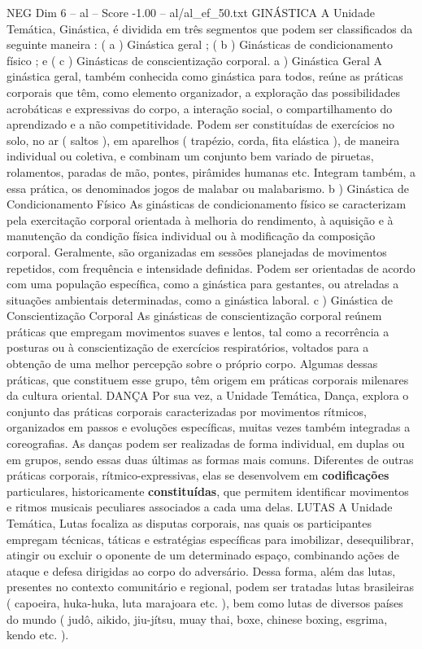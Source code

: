 \begin{textsample}{NEG Dim 6 – al – Score -1.00 – al/al\_ef\_50.txt}  \label{ex:f6_neg_061}
GINÁSTICA A Unidade Temática, Ginástica, é dividida em três segmentos que podem ser classificados da seguinte maneira : ( a ) Ginástica geral ; ( b ) Ginásticas de condicionamento físico ; e ( c ) Ginásticas de conscientização corporal. a ) Ginástica Geral A ginástica geral, também conhecida como ginástica para todos, reúne as práticas corporais que têm, como elemento organizador, a exploração das possibilidades acrobáticas e expressivas do corpo, a interação social, o compartilhamento do aprendizado e a não competitividade.
Podem ser constituídas de exercícios no solo, no ar ( saltos ), em aparelhos ( trapézio, corda, fita elástica ), de maneira individual ou coletiva, e combinam um conjunto bem variado de piruetas, rolamentos, paradas de mão, pontes, pirâmides humanas etc.
Integram também, a essa prática, os denominados jogos de malabar ou malabarismo. b ) Ginástica de Condicionamento Físico As ginásticas de condicionamento físico se caracterizam pela exercitação corporal orientada à melhoria do rendimento, à aquisição e à manutenção da condição física individual ou à modificação da composição corporal.
Geralmente, são organizadas em sessões planejadas de movimentos repetidos, com frequência e intensidade definidas.
Podem ser orientadas de acordo com uma população específica, como a ginástica para gestantes, ou atreladas a situações ambientais determinadas, como a ginástica laboral. c ) Ginástica de Conscientização Corporal As ginásticas de conscientização corporal reúnem práticas que empregam movimentos suaves e lentos, tal como a recorrência a posturas ou à conscientização de exercícios respiratórios, voltados para a obtenção de uma melhor percepção sobre o próprio corpo.
Algumas dessas práticas, que constituem esse grupo, têm origem em práticas corporais milenares da cultura oriental.
DANÇA Por sua vez, a Unidade Temática, Dança, explora o conjunto das práticas corporais caracterizadas por movimentos rítmicos, organizados em passos e evoluções específicas, muitas vezes também integradas a coreografias.
As danças podem ser realizadas de forma individual, em duplas ou em grupos, sendo essas duas últimas as formas mais comuns.
Diferentes de outras práticas corporais, rítmico-expressivas, elas se desenvolvem em \textbf{codificações} particulares, historicamente \textbf{constituídas}, que permitem identificar movimentos e ritmos musicais peculiares associados a cada uma delas.
LUTAS A Unidade Temática, Lutas focaliza as disputas corporais, nas quais os participantes empregam técnicas, táticas e estratégias específicas para imobilizar, desequilibrar, atingir ou excluir o oponente de um determinado espaço, combinando ações de ataque e defesa dirigidas ao corpo do adversário.
Dessa forma, além das lutas, presentes no contexto comunitário e regional, podem ser tratadas lutas brasileiras ( capoeira, huka-huka, luta marajoara etc. ), bem como lutas de diversos países do mundo ( judô, aikido, jiu-jítsu, muay thai, boxe, chinese boxing, esgrima, kendo etc. ).

\end{textsample}
